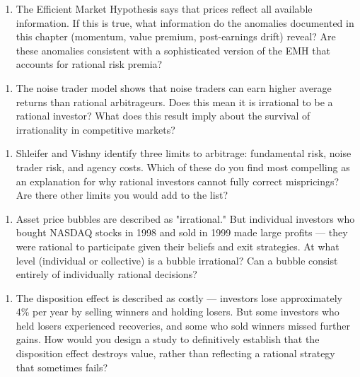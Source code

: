 \documentclass[12pt, letterpaper]{article}
\begin{document}
\begin{enumerate}
\item The Efficient Market Hypothesis says that prices reflect all available information. If this is true, what information do the anomalies documented in this chapter (momentum, value premium, post-earnings drift) reveal? Are these anomalies consistent with a sophisticated version of the EMH that accounts for rational risk premia?
\end{enumerate}

\begin{enumerate}
\item The noise trader model shows that noise traders can earn higher average returns than rational arbitrageurs. Does this mean it is irrational to be a rational investor? What does this result imply about the survival of irrationality in competitive markets?
\end{enumerate}

\begin{enumerate}
\item Shleifer and Vishny identify three limits to arbitrage: fundamental risk, noise trader risk, and agency costs. Which of these do you find most compelling as an explanation for why rational investors cannot fully correct mispricings? Are there other limits you would add to the list?
\end{enumerate}

\begin{enumerate}
\item Asset price bubbles are described as "irrational." But individual investors who bought NASDAQ stocks in 1998 and sold in 1999 made large profits --- they were rational to participate given their beliefs and exit strategies. At what level (individual or collective) is a bubble irrational? Can a bubble consist entirely of individually rational decisions?
\end{enumerate}

\begin{enumerate}
\item The disposition effect is described as costly --- investors lose approximately 4\% per year by selling winners and holding losers. But some investors who held losers experienced recoveries, and some who sold winners missed further gains. How would you design a study to definitively establish that the disposition effect destroys value, rather than reflecting a rational strategy that sometimes fails?
\end{enumerate}
\end{document}
